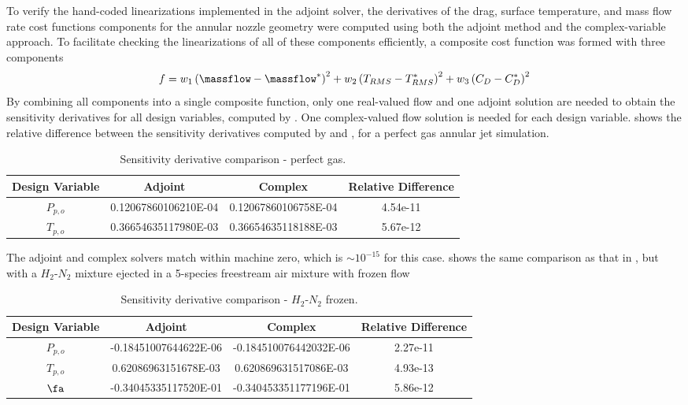 To verify the hand-coded linearizations implemented in the adjoint solver, the
derivatives of the drag, surface temperature, and mass flow rate cost functions
components for the annular nozzle geometry were computed using both the adjoint
method and the complex-variable approach.  To facilitate checking the
linearizations of all of these components efficiently, a composite cost function
was formed with three components
\begin{equation} 
  f = w_1\left( \massflow - \massflow^{*}\right)^{2} 
  + w_2\left( T_{RMS} - T_{RMS}^*\right)^2
  + w_3\left( C_{D} - C_{D}^*\right)^2
  \label{check-cost-func}
\end{equation}
By combining all components into a single composite function, only one
real-valued flow and one adjoint solution are needed to obtain the sensitivity
derivatives for all design variables, computed by . One
complex-valued flow solution is needed for each design variable.
 shows the relative difference between the sensitivity
derivatives computed by  and , for a
perfect gas annular jet simulation.
\begin{table}[h]
  \centering 
  \begin{tabular}{c|c|c|c} 
    Design Variable & Adjoint & Complex & Relative Difference \\ 
    \hline 
    $P_{p,o}$ & 0.12067860106210E-04 & 0.12067860106758E-04 & 4.54e-11 \\
    $T_{p,o}$ & 0.36654635117980E-03 & 0.36654635118188E-03 & 5.67e-12 
  \end{tabular}
  \caption{Sensitivity derivative comparison - perfect gas.}
  \label{tab:pg-deriv-check}
\end{table}
The adjoint and complex solvers match within machine zero, which is $\sim
10^{-15}$ for this case.   shows the same
comparison as that in , but with a $H_2$-$N_2$ mixture
ejected in a 5-species freestream air mixture with frozen flow
\begin{table}[h] 
  \centering 
  \begin{tabular}{c|c|c|c} 
    Design Variable & Adjoint & Complex & Relative Difference\\
    \hline 
    $P_{p,o}$ & -0.18451007644622E-06 & -0.184510076442032E-06 & 2.27e-11 \\ 
    $T_{p,o}$ &  0.62086963151678E-03 &  0.620869631517086E-03 & 4.93e-13 \\ 
    $\fa$     & -0.34045335117520E-01 & -0.340453351177196E-01 & 5.86e-12 
  \end{tabular}
  \caption{Sensitivity derivative comparison - $H_2$-$N_2$ frozen.}
  \label{tab:frozen-deriv-check}
\end{table}
